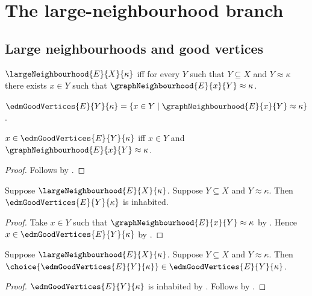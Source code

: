 \section{The large-neighbourhood branch}









\subsection{Large neighbourhoods and good vertices}

\begin{definition}\label{large_neighbourhood}
    $\largeNeighbourhood{E}{X}{\kappa}$ iff for every $Y$ such that
        $Y\subseteq X$ and $Y\approx\kappa$ there exists $x\in Y$ such that
        $\graphNeighbourhood{E}{x}{Y}\approx\kappa$.
\end{definition}

\begin{definition}\label{edm_good_vertices}
    $\edmGoodVertices{E}{Y}{\kappa}
        =\{x\in Y\mid
            \graphNeighbourhood{E}{x}{Y}\approx\kappa\}$.
\end{definition}

\begin{proposition}\label{edm_good_vertices_iff}
    $x\in\edmGoodVertices{E}{Y}{\kappa}$ iff
        $x\in Y$ and
        $\graphNeighbourhood{E}{x}{Y}\approx\kappa$.
\end{proposition}
\begin{proof}
    Follows by .
\end{proof}

\begin{proposition}\label{edm_good_vertices_inhabited}
    Suppose $\largeNeighbourhood{E}{X}{\kappa}$.
    Suppose $Y\subseteq X$ and $Y\approx\kappa$.
    Then $\edmGoodVertices{E}{Y}{\kappa}$ is inhabited.
\end{proposition}
\begin{proof}
    Take $x\in Y$ such that
        $\graphNeighbourhood{E}{x}{Y}\approx\kappa$ by
        .
    Hence $x\in\edmGoodVertices{E}{Y}{\kappa}$ by
        .
\end{proof}

\begin{proposition}\label{edm_good_vertex_choice}
    Suppose $\largeNeighbourhood{E}{X}{\kappa}$.
    Suppose $Y\subseteq X$ and $Y\approx\kappa$.
    Then $\choice{\edmGoodVertices{E}{Y}{\kappa}}
        \in\edmGoodVertices{E}{Y}{\kappa}$.
\end{proposition}
\begin{proof}
    $\edmGoodVertices{E}{Y}{\kappa}$ is inhabited by
        .
    Follows by .
\end{proof}

